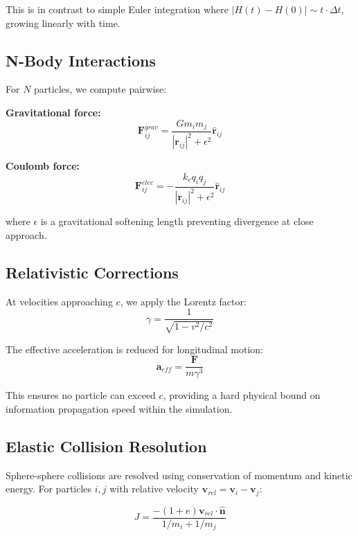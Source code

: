 \documentclass[12pt, a4paper]{article}
\begin{document}
This is in contrast to simple Euler integration where
$|H(t) - H(0)| \sim t \cdot \Delta t$, growing linearly with time.

\subsection{N-Body Interactions}

For $N$ particles, we compute pairwise:

\textbf{Gravitational force:}
\begin{equation}
    \mathbf{F}_{ij}^{grav} = \frac{G m_i m_j}{|\mathbf{r}_{ij}|^2 + \epsilon^2}
    \hat{\mathbf{r}}_{ij}
\end{equation}

\textbf{Coulomb force:}
\begin{equation}
    \mathbf{F}_{ij}^{elec} = -\frac{k_e q_i q_j}{|\mathbf{r}_{ij}|^2 + \epsilon^2}
    \hat{\mathbf{r}}_{ij}
\end{equation}

where $\epsilon$ is a gravitational softening length preventing divergence at
close approach.

\subsection{Relativistic Corrections}

At velocities approaching $c$, we apply the Lorentz factor:
\begin{equation}
    \gamma = \frac{1}{\sqrt{1 - v^2/c^2}}
\end{equation}

The effective acceleration is reduced for longitudinal motion:
\begin{equation}
    \mathbf{a}_{eff} = \frac{\mathbf{F}}{m \gamma^3}
\end{equation}

This ensures no particle can exceed $c$, providing a hard physical bound on
information propagation speed within the simulation.

\subsection{Elastic Collision Resolution}

Sphere-sphere collisions are resolved using conservation of momentum and
kinetic energy. For particles $i, j$ with relative velocity
$\mathbf{v}_{rel} = \mathbf{v}_i - \mathbf{v}_j$:

\begin{equation}
    J = \frac{-(1+e) \mathbf{v}_{rel} \cdot \hat{\mathbf{n}}}
        {1/m_i + 1/m_j}
\end{equation}
\end{document}
